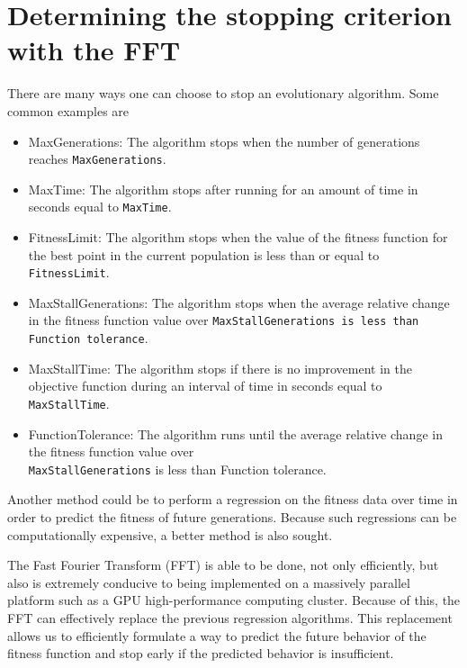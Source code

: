 \documentclass{article}
\renewcommand{\_}{\ifincsname_\else\legacyunderscore\fi}
\begin{document}
\section*{Determining the stopping criterion with the FFT}

There are many ways one can choose to stop an evolutionary algorithm.  Some common examples are \cite{StoppingCriteria}

\begin{itemize}
    \item MaxGenerations: The algorithm stops when the number of generations reaches \texttt{MaxGenerations}.
    
    \item MaxTime: The algorithm stops after running for an amount of time in seconds equal to \texttt{MaxTime}.
    
    \item FitnessLimit: The algorithm stops when the value of the fitness function for the best point in the current population is less than or equal to \texttt{FitnessLimit}.
    
    \item MaxStallGenerations: The algorithm stops when the average relative change in the fitness function value over \texttt{MaxStallGenerations is less than Function tolerance}.
    
    \item MaxStallTime: The algorithm stops if there is no improvement in the objective function during an interval of time in seconds equal to \texttt{MaxStallTime}.
    
    \item FunctionTolerance: The algorithm runs until the average relative change in the fitness function value over\\ \texttt{MaxStallGenerations} is less than Function tolerance.
\end{itemize}

Another method could be to perform a regression on the fitness data over time in order to predict the fitness of future generations.  Because such regressions can be computationally expensive, a better method is also sought.  

The Fast Fourier Transform (FFT) is able to be done, not only efficiently, but also is extremely conducive to being implemented on a massively parallel platform such as a GPU high-performance computing cluster.  Because of this, the FFT can effectively replace the previous regression algorithms.  This replacement allows us to efficiently formulate a way to predict the future behavior of the fitness function and stop early if the predicted behavior is insufficient.
\end{document}
